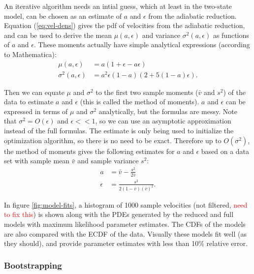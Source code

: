 \documentclass{article}
\begin{document}
An iterative algorithm needs an intial guess, which at least in the
two-state model, can be chosen as an estimate of $a$ and $\epsilon$
from the adiabatic reduction. Equation (\ref{eq:vel-dens}) gives the
pdf of velocities from the adiabatic reduction, and can be used to
derive the mean $\mu(a, \epsilon)$ and variance $\sigma^2(a,
\epsilon)$ as functions of $a$ and $\epsilon$. These moments actually
have simple analytical expressions (according to Mathematica):
\begin{align}
  \label{eq:mean-ar}
  \mu(a, \epsilon) &= a(1 + \epsilon - a \epsilon) \\
  \label{eq:var-ar}
  \sigma^2(a, \epsilon) &= a^2 \epsilon (1 - a) (2 + 5(1 - a) \epsilon).
\end{align}

Then we can equate $\mu$ and $\sigma^2$ to the first two sample
moments ($\bar{v}$ and $s^2$) of the data to estimate $a$ and
$\epsilon$ (this is called the method of moments). $a$ and $\epsilon$
can be expressed in terms of $\mu$ and $\sigma^2$ analytically, but
the formulas are messy. Note that $\sigma^2 = O(\epsilon)$ and
$\epsilon << 1$, so we can use an asymptotic approximation instead of
the full formulas. The estimate is only being used to initialize the
optimization algorithm, so there is no need to be exact. Therefore up
to $O(\sigma^2)$, the method of moments gives the following estimates
for $a$ and $\epsilon$ based on a data set with sample mean $\bar{v}$
and sample variance $s^2$:
\begin{align}
  \label{eq:mean-est}
  a &= \bar{v} - \frac{s^2}{2\bar{v}} \\
  \label{eq:var-est}
  \epsilon &= \frac{s^2}{2(1 - \bar{v})(\bar{v})^2}.
\end{align}

In figure \ref{fig:model-fits}, a histogram of 1000 sample velocities
(not filtered, \textcolor{red}{need to fix this}) is shown along with
the PDEs generated by the reduced and full models with maximum
likelihood parameter estimates. The CDFs of the models are also
compared with the ECDF of the data. Visually these models fit well (as
they should), and provide parameter estimates with less than 10\%
relative error.

\subsubsection{Bootstrapping}
\label{sec:bootstrapping}
\end{document}
